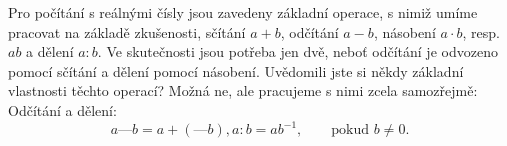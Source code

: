       Pro počítání s reálnými čísly jsou zavedeny základní operace, s nimiž umíme pracovat na
      základě zkušenosti, sčítání \(a + b\), odčítání \(a - b\), násobení \(a \cdot b\), resp. 
      \(ab\) a dělení \(a : b\). Ve skutečnosti jsou potřeba jen dvě, neboť odčítání je odvozeno 
      pomocí sčítání a dělení pomocí násobení. Uvědomili jste si někdy základní vlastnosti těchto 
      operací? Možná ne, ale pracujeme s nimi zcela samozřejmě:
      Odčítání a dělení:
      \begin{equation*}
        a — b = a + (—b), a:b = ab^{-1}, \qquad\text{pokud } b\neq0.
      \end{equation*}
      
